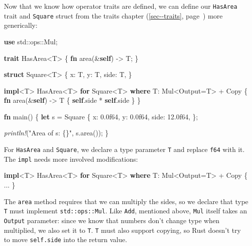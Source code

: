 \documentclass[a4paper,]{book}
\renewcommand*{\hyperlink}[2]{%
 #2 (\autoref{#1}, page~\pageref{#1})}
\newenvironment{Shaded}{\begin{snugshade}}{\end{snugshade}}
\newcommand{\KeywordTok}[1]{\textcolor[rgb]{0.13,0.29,0.53}{\textbf{{#1}}}}
\newcommand{\DecValTok}[1]{\textcolor[rgb]{0.00,0.00,0.81}{{#1}}}
\newcommand{\StringTok}[1]{\textcolor[rgb]{0.31,0.60,0.02}{{#1}}}
\newcommand{\BuiltInTok}[1]{{#1}}
\newcommand{\PreprocessorTok}[1]{\textcolor[rgb]{0.56,0.35,0.01}{\textit{{#1}}}}
\newcommand{\NormalTok}[1]{{#1}}
\begin{document}
Now that we know how operator traits are defined, we can define our
\texttt{HasArea} trait and \texttt{Square} struct from the
\protect\hyperlink{sec--traits}{traits chapter} more generically:

\begin{Shaded}
\begin{Highlighting}[]
\KeywordTok{use} \NormalTok{std::ops::Mul;}

\KeywordTok{trait} \NormalTok{HasArea<T> \{}
    \KeywordTok{fn} \NormalTok{area(&}\KeywordTok{self}\NormalTok{) -> T;}
\NormalTok{\}}

\KeywordTok{struct} \NormalTok{Square<T> \{}
    \NormalTok{x: T,}
    \NormalTok{y: T,}
    \NormalTok{side: T,}
\NormalTok{\}}

\KeywordTok{impl}\NormalTok{<T> HasArea<T> }\KeywordTok{for} \NormalTok{Square<T>}
        \KeywordTok{where} \NormalTok{T: Mul<Output=T> + }\BuiltInTok{Copy} \NormalTok{\{}
    \KeywordTok{fn} \NormalTok{area(&}\KeywordTok{self}\NormalTok{) -> T \{}
        \KeywordTok{self}\NormalTok{.side * }\KeywordTok{self}\NormalTok{.side}
    \NormalTok{\}}
\NormalTok{\}}

\KeywordTok{fn} \NormalTok{main() \{}
    \KeywordTok{let} \NormalTok{s = Square \{}
        \NormalTok{x: }\DecValTok{0.0f64}\NormalTok{,}
        \NormalTok{y: }\DecValTok{0.0f64}\NormalTok{,}
        \NormalTok{side: }\DecValTok{12.0f64}\NormalTok{,}
    \NormalTok{\};}

    \PreprocessorTok{println!}\NormalTok{(}\StringTok{"Area of s: \{\}"}\NormalTok{, s.area());}
\NormalTok{\}}
\end{Highlighting}
\end{Shaded}

For \texttt{HasArea} and \texttt{Square}, we declare a type parameter
\texttt{T} and replace \texttt{f64} with it. The \texttt{impl} needs
more involved modifications:

\begin{Shaded}
\begin{Highlighting}[]
\KeywordTok{impl}\NormalTok{<T> HasArea<T> }\KeywordTok{for} \NormalTok{Square<T>}
        \KeywordTok{where} \NormalTok{T: Mul<Output=T> + }\BuiltInTok{Copy} \NormalTok{\{ ... \}}
\end{Highlighting}
\end{Shaded}

The \texttt{area} method requires that we can multiply the sides, so we
declare that type \texttt{T} must implement \texttt{std::ops::Mul}. Like
\texttt{Add}, mentioned above, \texttt{Mul} itself takes an
\texttt{Output} parameter: since we know that numbers don't change type
when multiplied, we also set it to \texttt{T}. \texttt{T} must also
support copying, so Rust doesn't try to move \texttt{self.side} into the
return value.
\end{document}
